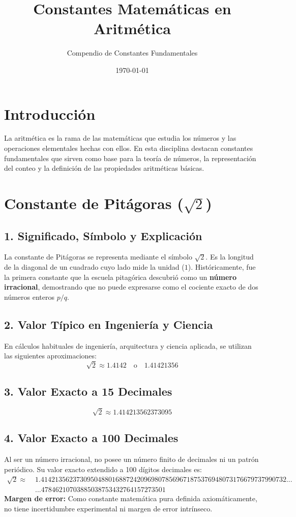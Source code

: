 \documentclass[12pt,a4paper]{article}
\title{\textbf{Constantes Matemáticas en Aritmética}}
\author{Compendio de Constantes Fundamentales}
\date{\today}
\begin{document}
\maketitle

\section*{Introducción}
La aritmética es la rama de las matemáticas que estudia los números y las operaciones elementales hechas con ellos. En esta disciplina destacan constantes fundamentales que sirven como base para la teoría de números, la representación del conteo y la definición de las propiedades aritméticas básicas.

\section{Constante de Pitágoras ($\sqrt{2}$)}

\subsection*{1. Significado, Símbolo y Explicación}
La constante de Pitágoras se representa mediante el símbolo $\sqrt{2}$. Es la longitud de la diagonal de un cuadrado cuyo lado mide la unidad ($1$). Históricamente, fue la primera constante que la escuela pitagórica descubrió como un \textbf{número irracional}, demostrando que no puede expresarse como el cociente exacto de dos números enteros $p/q$.

\subsection*{2. Valor Típico en Ingeniería y Ciencia}
En cálculos habituales de ingeniería, arquitectura y ciencia aplicada, se utilizan las siguientes aproximaciones:
\begin{equation*}
\sqrt{2} \approx 1.4142 \quad \text{o} \quad 1.41421356
\end{equation*}

\subsection*{3. Valor Exacto a 15 Decimales}
\begin{equation*}
\sqrt{2} \approx 1.414213562373095
\end{equation*}

\subsection*{4. Valor Exacto a 100 Decimales}
Al ser un número irracional, no posee un número finito de decimales ni un patrón periódico. Su valor exacto extendido a 100 dígitos decimales es:
\begin{align*}
\sqrt{2} \approx \; & 1.414213562373095048801688724209698078569671875376948073176679737990732... \\
& ...47846210703885038753432764157273501
\end{align*}
\textbf{Margen de error:} Como constante matemática pura definida axiomáticamente, no tiene incertidumbre experimental ni margen de error intrínseco.
\end{document}
